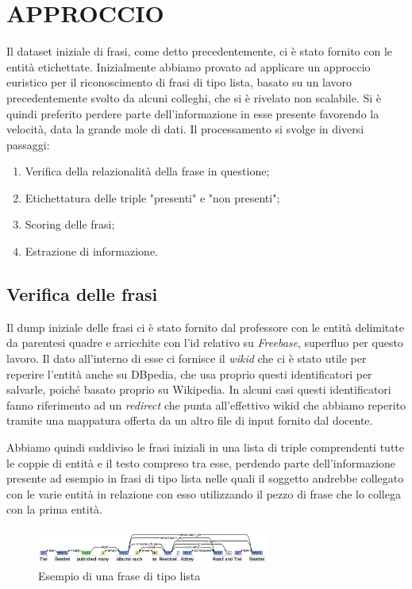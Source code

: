 \documentclass[10pt,a4paper,twocolumn]{article}
\begin{document}
\section{APPROCCIO}

Il dataset iniziale di frasi, come detto precedentemente, ci è stato fornito con le entità etichettate. Inizialmente abbiamo provato ad applicare un approccio euristico per il riconoscimento di frasi di tipo lista, basato su un lavoro precedentemente svolto da alcuni colleghi, che si è rivelato non scalabile. Si è quindi preferito perdere parte dell'informazione in esse presente favorendo la velocità, data la grande mole di dati.
Il processamento si svolge in diversi passaggi:
\begin{enumerate}
\item Verifica della relazionalità della frase in questione;
\item Etichettatura delle triple "presenti" e "non presenti";
\item Scoring delle frasi;
\item Estrazione di informazione.
\end{enumerate}

\subsection{Verifica delle frasi}
Il dump iniziale delle frasi ci è stato fornito dal professore con le entità delimitate da parentesi quadre e arricchite con l'id relativo su \textit{Freebase}, superfluo per questo lavoro. Il dato all'interno di esse ci fornisce il \textit{wikid} che ci è stato utile per reperire l'entità anche su DBpedia, che usa proprio questi identificatori per salvarle, poiché basato proprio su Wikipedia. In alcuni casi questi identificatori fanno riferimento ad un \textit{redirect} che punta all'effettivo wikid che abbiamo reperito tramite una mappatura offerta da un altro file di input fornito dal docente.

Abbiamo quindi suddiviso le frasi iniziali in una lista di triple comprendenti tutte le coppie di entità e il testo compreso tra esse, perdendo parte dell'informazione presente ad esempio in frasi di tipo lista nelle quali il soggetto andrebbe collegato con le varie entità in relazione con esso utilizzando il pezzo di frase che lo collega con la prima entità.
\begin{figure}[h]
	\includegraphics[width=7.7cm, height=1.2cm]{stanford}
	\caption{Esempio di una frase di tipo lista}
\end{figure}
\end{document}
